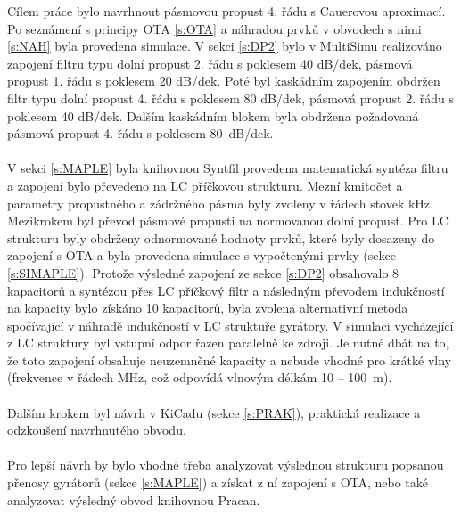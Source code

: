 \noindent Cílem práce bylo navrhnout pásmovou propust 4. řádu s Cauerovou aproximací. Po seznámení s principy OTA \ref{s:OTA} a náhradou prvků v obvodech s nimi \ref{s:NAH} byla provedena simulace. V sekci \ref{s:DP2} bylo v MultiSimu realizováno zapojení filtru typu dolní propust 2. řádu s poklesem 40 dB/dek, pásmová propust 1. řádu s poklesem 20 dB/dek. Poté byl kaskádním zapojením obdržen filtr typu dolní propust 4. řádu s poklesem 80 dB/dek, pásmová propust 2. řádu s poklesem 40 dB/dek. Dalším kaskádním blokem byla obdržena požadovaná pásmová propust 4. řádu s poklesem 80~dB/dek.\\
\\
V sekci \ref{s:MAPLE} byla knihovnou Syntfil provedena matematická syntéza filtru a zapojení bylo převedeno na LC příčkovou strukturu. Mezní kmitočet a parametry propustného a zádržného pásma byly zvoleny v řádech stovek kHz. Mezikrokem byl převod pásmové propusti na normovanou dolní propust. Pro LC strukturu byly obdrženy odnormované hodnoty prvků, které byly dosazeny do zapojení s OTA a byla provedena simulace s vypočtenými prvky (sekce \ref{s:SIMAPLE}). Protože výsledné zapojení ze sekce \ref{s:DP2} obsahovalo 8 kapacitorů a syntézou přes LC příčkový filtr a následným převodem indukčností na kapacity bylo získáno 10 kapacitorů, byla zvolena alternativní metoda spočívající v náhradě indukčností v LC struktuře gyrátory. V simulaci vycházející z LC struktury byl vstupní odpor řazen paralelně ke zdroji. Je nutné dbát na to, že toto zapojení obsahuje neuzemněné kapacity a nebude vhodné pro krátké vlny (frekvence v řádech MHz, což odpovídá vlnovým délkám 10 -- 100~m). \\
\\
Dalším krokem byl návrh v KiCadu (sekce \ref{s:PRAK}), praktická realizace a odzkoušení navrhnutého obvodu.\\
\\
Pro lepší návrh by bylo vhodné třeba analyzovat výslednou strukturu popsanou přenosy gyrátorů (sekce \ref{s:MAPLE}) a získat z ní zapojení s OTA, nebo také analyzovat výsledný obvod knihovnou Pracan.